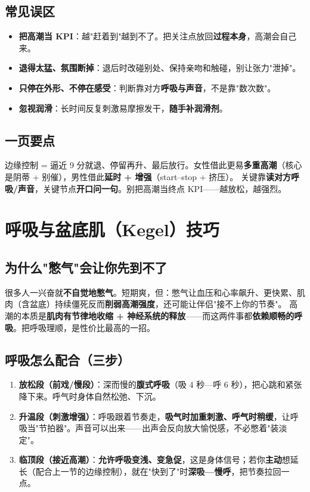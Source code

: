 \section{常见误区}
\begin{itemize}[leftmargin=2em,itemsep=0.3em]
  \item \textbf{把高潮当 KPI}：越"赶着到"越到不了。把关注点放回\textbf{过程本身}，高潮会自己来。
  \item \textbf{退得太猛、氛围断掉}：退后时改碰别处、保持亲吻和触碰，别让张力"泄掉"。
  \item \textbf{只停在外形、不停在感受}：判断靠对方\textbf{呼吸与声音}，不是靠"数次数"。
  \item \textbf{忽视润滑}：长时间反复刺激易摩擦发干，\textbf{随手补润滑剂}。
\end{itemize}

\section{一页要点}
边缘控制 = 逼近 9 分就退、停留再升、最后放行。女性借此更易\textbf{多重高潮}（核心是阴蒂 + 别催），男性借此\textbf{延时 + 增强}（start--stop + 挤压）。
关键靠\textbf{读对方呼吸/声音}，关键节点\textbf{开口问一句}。别把高潮当终点 KPI——越放松，越强烈。


\chapter{呼吸与盆底肌（Kegel）技巧}

\section{为什么"憋气"会让你先到不了}
很多人一兴奋就\textbf{不自觉地憋气}。短期爽，但：憋气让血压和心率飙升、更快累、肌肉（含盆底）持续僵死反而\textbf{削弱高潮强度}，还可能让伴侣"接不上你的节奏"。
高潮的本质是\textbf{肌肉有节律地收缩 + 神经系统的释放}——而这两件事都\textbf{依赖顺畅的呼吸}。把呼吸理顺，是性价比最高的一招。

\section{呼吸怎么配合（三步）}
\begin{enumerate}[leftmargin=2em,itemsep=0.3em]
  \item \textbf{放松段（前戏/慢段）}：深而慢的\textbf{腹式呼吸}（吸 4 秒—呼 6 秒），把心跳和紧张降下来。呼气时身体自然松弛、下沉。
  \item \textbf{升温段（刺激增强）}：呼吸跟着节奏走，\textbf{吸气时加重刺激、呼气时稍缓}，让呼吸当"节拍器"。声音可以出来——出声会反向放大愉悦感，不必憋着"装淡定"。
  \item \textbf{临顶段（接近高潮）}：\textbf{允许呼吸变浅、变急促}，这是身体信号；若你\textbf{主动}想延长（配合上一节的边缘控制），就在"快到了"时\textbf{深吸—慢呼}，把节奏拉回一点。
\end{enumerate}

